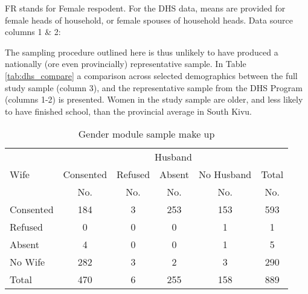 \documentclass[10pt,a4paper,abstract=on]{scrartcl} %
\begin{document}
\begin{threeparttable}
	\caption{Dempographics for DHS data and sample}\label{tab:dhs_compare}
	\centering
	
	\begin{tablenotes}
	\small
	\item FR stands for Female respodent. For the DHS data, means are provided for female heads of household, or female spouses of household heads. Data source columns 1 \& 2: \citep{DHSCongoReport}
	\item
	\end{tablenotes}
	
\end{threeparttable}

The sampling procedure outlined here is thus unlikely to have produced a nationally (ore even provincially) representative sample. In Table \ref{tab:dhs_compare} a comparison across selected demographics between the full study sample (column 3), and the representative sample from the DHS Program (columns 1-2) is presented. Women in the study sample are older, and less likely to have finished school, than the provincial average in South Kivu.


\begin{table}[htb]
\centering
\caption{Gender module sample make up}
\label{tab:bargsample}
\begin{tabular}{l c c c c c}
\toprule
 & \multicolumn{5}{c}{Husband} \\
Wife&Consented&Refused&Absent&No Husband&Total \\
&No.&No.&No.&No.&No. \\
\hline
Consented&184&3&253&153&593 \\
Refused&0&0&0&1&1 \\
Absent&4&0&0&1&5 \\
No Wife&282&3&2&3&290 \\
Total&470&6&255&158&889 \\
\bottomrule
\end{tabular}
\end{table}
\end{document}
